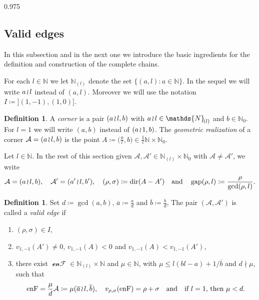 \documentclass[reqno,a4paper,twoside]{amsart}
\theoremstyle{definition}
\newtheorem{definition}[theorem]{Definition}
\theoremstyle{remark}
\DeclareMathOperator{\gap}{gap}
\DeclareMathOperator{\dir}{dir}
\newcommand{\ov}{\overline}
\DeclareMathOperator{\enF}{enF}
\newcommand{\wrs}{\hspace{-0.9pt}\wr\hspace{-0.9pt}}
\begin{document}
\begin{spacing}{0.975}
\subsection{Valid edges}

In this subsection and in the next one we introduce the basic ingredients for the definition and construction of the complete chains.

\smallskip

For each $l\in \mathds{N}$ we let $\mathds{N}_{\!(l)}$ denote the set $\{(a,l): a\in \mathds{N}\}$. In the sequel we will write $a\wrs l$ instead of $(a,l)$. Moreover we will use the notation $I\coloneqq ](1,-1),(1,0)]$.

\begin{definition}\label{realizacion geometrica}
A {\em corner} is a pair $(a\wrs l,b)$ with $a\wrs l\in \mathds{N}_{\!(l)}$ and $b\in \mathds{N}_0$. For $l=1$ we will write $(a,b)$ instead of $(a\wrs 1,b)$. The {\em geometric realization} of a corner $\mathcal{A}=(a\wrs l,b)$ is the point $A\coloneqq \bigl(\frac{a}{l},b\bigr) \in \frac{1}{l}\mathds{N}\times \mathds{N}_0$.
\end{definition}

\smallskip

Let $l\in \mathds{N}$. In the rest of this section given $\mathcal{A},\mathcal{A}'\in \mathds{N}_{\!(l)}\times\mathds{N}_0$ with $\mathcal{A}\ne \mathcal{A}'$, we write
$$
\mathcal{A} = (a\wrs l,b),\quad \mathcal{A}' = (a'\wrs l,b'), \quad (\rho,\sigma)\coloneqq \dir (A-A') \quad\text{and}\quad \gap(\rho,l)\coloneqq \frac{\rho}{\gcd(\rho,l)}.
$$

\begin{definition}\label{valid edges}
Set $d\coloneqq \gcd(a,b)$, $\ov a\coloneqq \frac{a}{d}$ and $\ov b\coloneqq \frac{b}{d}$, The pair $(\mathcal{A},\mathcal{A}')$ is called a {\em valid edge} if

\begin{enumerate}[itemsep=1.0ex,topsep=1.0ex]

\item $(\rho,\sigma)\in I$,

\item $v_{1,-1}(A')\ne 0$, $v_{1,-1}(A)<0$ and $v_{1,-1}(A)<v_{1,-1}(A')$,

\item there exist $\mathcal{\enF}\in\mathds{N}_{\!(l)}\times\mathds{N}$ and $\mu\in \mathds{N}$, with $\mu\le l(bl-a)+1/\ov b$ and $d\nmid \mu$, such that
$$
\mathcal{\enF}=\frac{\mu}{d} \mathcal{A}\coloneqq \mu(\ov a\wrs l,\ov b),\quad v_{\rho,\sigma}(\enF) = \rho+\sigma \quad\text{and}\quad \text{if $l=1$, then $\mu<d$.}
$$


\end{enumerate}
\end{definition}
\end{spacing}
\end{document}
